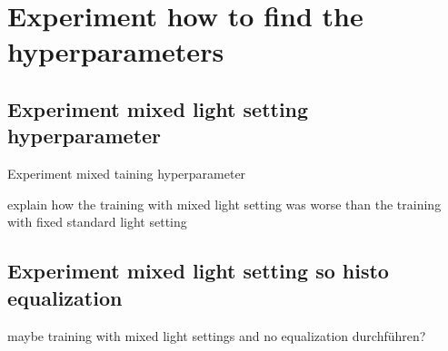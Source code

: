 \chapter{Experiment how to find the hyperparameters}


\section{Experiment mixed light setting hyperparameter}
\label{cha:experiment_mixed_training}

Experiment mixed taining hyperparameter

explain how the training with mixed light setting was worse than the training with fixed standard light setting


\section{Experiment mixed light setting so histo equalization}
\label{cha:experiment_mixed_training_no_equalization}

maybe training with mixed light settings and no equalization durchführen?

